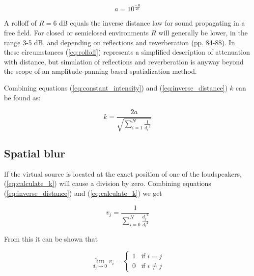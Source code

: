 \documentclass[twoside,10pt]{article}
\begin{document}
\begin{equation} \label{eq:rolloff}
	a = 10^{\frac{-R}{20}}
\end{equation}

A rolloff of $R = 6$ dB equals the inverse distance law for sound propagating in a free field. For closed or semiclosed environments $R$ will generally be lower, in the range 3-5 dB, and depending on reflections and reverberation \cite{Everest:2000handbook_acoustics} (pp. 84-88). In these circumstances (\ref{eq:rolloff}) represents a simplified description of attenuation with distance, but simulation of reflections and reverberation is anyway beyond the scope of an amplitude-panning based spatialization method.


Combining equations (\ref{eq:constant_intensity}) and (\ref{eq:inverse_distance}) $k$ can be found as:

\begin{equation} \label{eq:calculate_k}
k = \frac{2a}{\sqrt{\sum_{i=1}^{N} \frac{1}{{d_{i}}^2}}}
\end{equation}




\subsection{Spatial blur}

If the virtual source is located at the exact position of one of the loudspeakers, (\ref{eq:calculate_k}) will cause a division by zero. Combining equations (\ref{eq:inverse_distance}) and (\ref{eq:calculate_k}) we get

\begin{equation}
v_{j} = \frac{1}{\sum_{i=0}^{N} \frac{{d_{j}}^2}{{d_{i}}^2}}
\end{equation}

From this it can be shown that

\begin{equation} \label{eq:distance_zero}
\lim_{d_{j} \rightarrow 0} v_{i} = 
\left\{ \begin{array}{ll} 
1 & \textrm{if $i=j$}\\ 
0 & \textrm{if $i \ne j$}
\end{array} \right.
\end{equation}
\end{document}

